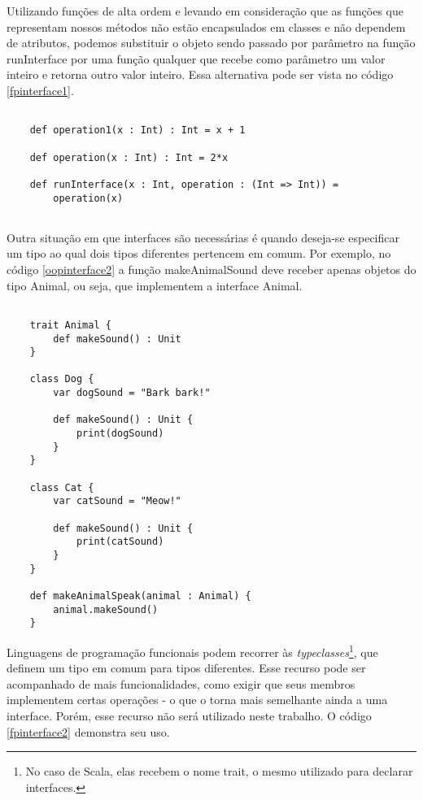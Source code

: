 Utilizando funções de alta ordem e levando em 
consideração que as funções que representam nossos 
métodos não estão encapsulados em classes e 
não dependem de atributos, podemos substituir o 
objeto sendo passado por parâmetro na função 
runInterface por uma função qualquer que recebe 
como parâmetro um valor inteiro e retorna outro 
valor inteiro. Essa alternativa pode ser vista 
no código \ref{fpinterface1}.

\begin{lstlisting}[caption={Interfaces em Programação Funcional},label=fpinterface1]
    
    def operation1(x : Int) : Int = x + 1

    def operation(x : Int) : Int = 2*x

    def runInterface(x : Int, operation : (Int => Int)) =
        operation(x)
    
\end{lstlisting}



Outra situação em que interfaces são necessárias 
é quando deseja-se especificar um tipo ao qual 
dois tipos diferentes pertencem em comum. Por 
exemplo, no código \ref{oopinterface2} a função 
makeAnimalSound deve receber apenas objetos 
do tipo Animal, ou seja, que implementem 
a interface Animal.

\begin{lstlisting}[caption={Interfaces em Orientação a Objetos},label=oopinterface2]
    
    trait Animal {
        def makeSound() : Unit
    }

    class Dog {
        var dogSound = "Bark bark!"

        def makeSound() : Unit {
            print(dogSound)
        }
    }

    class Cat {
        var catSound = "Meow!"

        def makeSound() : Unit {
            print(catSound)
        }
    }

    def makeAnimalSpeak(animal : Animal) {
        animal.makeSound()
    }

\end{lstlisting}

Linguagens de programação funcionais podem 
recorrer às \textit{typeclasses}\footnote{
    No caso de Scala, elas recebem o nome trait, 
    o mesmo utilizado para declarar interfaces.
}, que definem um tipo em comum para tipos 
diferentes. Esse recurso pode ser acompanhado 
de mais funcionalidades, como exigir que seus 
membros implementem certas operações - o que 
o torna mais semelhante ainda a uma interface. 
Porém, esse recurso não será utilizado neste 
trabalho. O código \ref{fpinterface2} demonstra 
seu uso.


